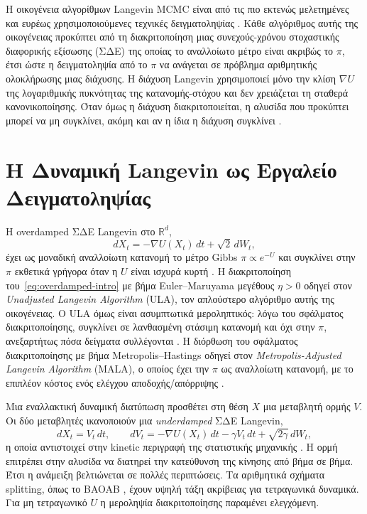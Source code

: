 Η οικογένεια αλγορίθμων Langevin MCMC είναι από τις πιο εκτενώς μελετημένες και
ευρέως χρησιμοποιούμενες τεχνικές δειγματοληψίας \citep{roberts1996exponential, dalalyan2017theoretical, durmus2017nonasymptotic}. Κάθε αλγόριθμος αυτής της οικογένειας προκύπτει από τη
διακριτοποίηση μιας συνεχούς-χρόνου στοχαστικής διαφορικής εξίσωσης (ΣΔΕ) της
οποίας το αναλλοίωτο μέτρο είναι ακριβώς το $\pi$, έτσι ώστε η δειγματοληψία από
το $\pi$ να ανάγεται σε πρόβλημα αριθμητικής ολοκλήρωσης μιας διάχυσης. Η διάχυση
Langevin χρησιμοποιεί μόνο την κλίση
$\nabla U$ της λογαριθμικής πυκνότητας της κατανομής-στόχου και δεν χρειάζεται τη
σταθερά κανονικοποίησης. Όταν όμως η διάχυση διακριτοποιείται,
η αλυσίδα που προκύπτει μπορεί να μη συγκλίνει, ακόμη και αν η ίδια η διάχυση
συγκλίνει \citep{roberts1996exponential}.

\section{Η Δυναμική Langevin ως Εργαλείο Δειγματοληψίας}
\label{sec:intro-langevin}

Η overdamped ΣΔΕ Langevin στο $\mathbb{R}^d$,
\begin{equation}
  dX_t = -\nabla U(X_t)\, dt + \sqrt{2}\, dW_t,
  \label{eq:overdamped-intro}
\end{equation}
έχει ως μοναδική αναλλοίωτη κατανομή το μέτρο Gibbs $\pi \propto e^{-U}$ και
συγκλίνει στην $\pi$ εκθετικά γρήγορα όταν η $U$ είναι ισχυρά κυρτή \citep{roberts1996exponential, bakry2014analysis}. Η διακριτοποίηση
του~\eqref{eq:overdamped-intro} με βήμα Euler--Maruyama μεγέθους $\eta > 0$ οδηγεί
στον \emph{Unadjusted Langevin Algorithm} (ULA), τον απλούστερο αλγόριθμο αυτής
της οικογένειας.  Ο ULA όμως είναι ασυμπτωτικά μεροληπτικός: λόγω του
  σφάλματος διακριτοποίησης, συγκλίνει σε λανθασμένη στάσιμη κατανομή
  και όχι στην $\pi$, ανεξαρτήτως πόσα δείγματα συλλέγονται
  \citep{roberts2001ula}. Η διόρθωση του σφάλματος διακριτοποίησης με βήμα
Metropolis--Hastings οδηγεί στον \emph{Metropolis-Adjusted Langevin Algorithm}
(MALA), ο οποίος έχει την $\pi$ ως αναλλοίωτη κατανομή, με το επιπλέον κόστος ενός
ελέγχου αποδοχής/απόρριψης \citep{roberts1998optimal, roberts2001ula}.

Μια εναλλακτική δυναμική διατύπωση προσθέτει στη θέση $X$ μια μεταβλητή
ορμής $V$. Οι δύο μεταβλητές ικανοποιούν μια \emph{underdamped} ΣΔΕ Langevin,
\begin{equation}
  dX_t = V_t\, dt, \qquad
  dV_t = -\nabla U(X_t)\, dt - \gamma V_t\, dt + \sqrt{2\gamma}\, dW_t,
  \label{eq:underdamped-intro}
\end{equation}
η οποία αντιστοιχεί στην kinetic περιγραφή της στατιστικής μηχανικής
\citep{leimkuhler2015molecular}. Η ορμή επιτρέπει στην αλυσίδα να διατηρεί
την κατεύθυνση της κίνησης από βήμα σε βήμα. Έτσι η ανάμειξη βελτιώνεται σε
πολλές περιπτώσεις. Τα αριθμητικά σχήματα splitting, όπως το BAOAB
\citep{leimkuhler2013bao}, έχουν υψηλή τάξη ακρίβειας για τετραγωνικά δυναμικά.
Για μη τετραγωνικό $U$ η μεροληψία διακριτοποίησης παραμένει ελεγχόμενη.

